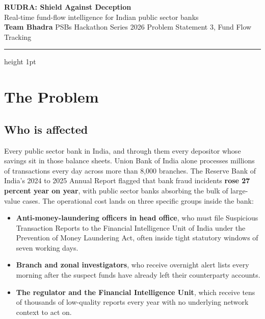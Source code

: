 \documentclass[10pt,a4paper]{article}
\begin{document}
\noindent
{\LARGE\bfseries\color{ink} RUDRA: Shield Against Deception}\\[2pt]
{\color{muted}\small Real-time fund-flow intelligence for Indian public sector banks}\\[1pt]
{\color{accent}\small\bfseries Team Bhadra} \hspace{0.4em}\textbar\hspace{0.4em}
{\color{muted}\small PSBs Hackathon Series 2026 \hspace{0.4em}\textbar\hspace{0.4em}
Problem Statement 3, Fund Flow Tracking}
\vspace{-2pt}
\noindent\color{rule}\hrule height 1pt
\vspace{2pt}

\section*{The Problem}

\subsection*{Who is affected}
Every public sector bank in India, and through them every depositor whose savings sit in those balance sheets. Union Bank of India alone processes millions of transactions every day across more than 8,000 branches. The Reserve Bank of India's 2024 to 2025 Annual Report flagged that bank fraud incidents \textbf{rose 27 percent year on year}, with public sector banks absorbing the bulk of large-value cases. The operational cost lands on three specific groups inside the bank:
\begin{itemize}
  \item \textbf{Anti-money-laundering officers in head office}, who must file Suspicious Transaction Reports to the Financial Intelligence Unit of India under the Prevention of Money Laundering Act, often inside tight statutory windows of seven working days.
  \item \textbf{Branch and zonal investigators}, who receive overnight alert lists every morning after the suspect funds have already left their counterparty accounts.
  \item \textbf{The regulator and the Financial Intelligence Unit}, which receive tens of thousands of low-quality reports every year with no underlying network context to act on.
\end{itemize}
\end{document}
